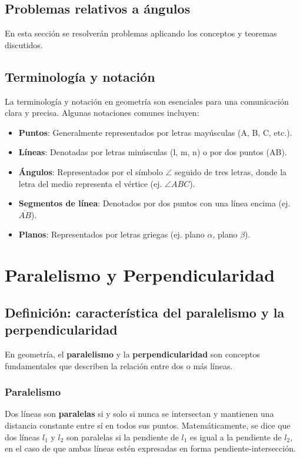 \subsection{Problemas relativos a ángulos}
En esta sección se resolverán problemas aplicando los conceptos y teoremas discutidos.

 

\subsection{Terminología y notación}
La terminología y notación en geometría son esenciales para una comunicación clara y precisa. Algunas notaciones comunes incluyen:
\begin{itemize}
    \item \textbf{Puntos}: Generalmente representados por letras mayúsculas (A, B, C, etc.).
    \item \textbf{Líneas}: Denotadas por letras minúsculas (l, m, n) o por dos puntos (AB).
    \item \textbf{Ángulos}: Representados por el símbolo $\angle$ seguido de tres letras, donde la letra del medio representa el vértice (ej. $\angle ABC$).
    \item \textbf{Segmentos de línea}: Denotados por dos puntos con una línea encima (ej. $\overline{AB}$).
    \item \textbf{Planos}: Representados por letras griegas (ej. plano $\alpha$, plano $\beta$).
\end{itemize}




\section{Paralelismo y Perpendicularidad} %

\subsection{Definición: característica del paralelismo y la perpendicularidad}

En geometría, el \textbf{paralelismo} y la \textbf{perpendicularidad} son conceptos fundamentales que describen la relación entre dos o más líneas.

\subsubsection{Paralelismo}

Dos líneas son \textbf{paralelas} si y solo si nunca se intersectan y mantienen una distancia constante entre sí en todos sus puntos. Matemáticamente, se dice que dos líneas \( l_1 \) y \( l_2 \) son paralelas si la pendiente de \( l_1 \) es igual a la pendiente de \( l_2 \), en el caso de que ambas líneas estén expresadas en forma pendiente-intersección.

